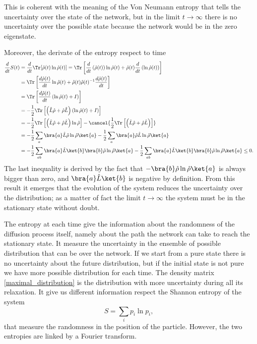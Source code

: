 This is coherent with the meaning of the Von Neumann entropy that tells the uncertainty over the state of the network, but in the limit $t \rightarrow \infty$ there is no uncertainty over the possible state because the network would be in the zero eigenstate.

Moreover, the derivate of the entropy respect to time 
\begin{equation}
    \begin{split}
        \frac{d}{dt} S(t) &= \frac{d}{dt} \Tr[\hat\rho(t) \ln\hat\rho(t)] = \Tr\left[\frac{d}{dt}\left(\hat\rho(t)\right)\ln\hat\rho(t) + \hat\rho(t) \frac{d}{dt}\left(\ln\hat\rho(t)\right)\right]\\
        &= \Tr\left[\frac{d\hat\rho(t)}{dt}\ln\hat\rho(t) + \hat\rho(t)\hat\rho(t)^{-1}\frac{d\hat\rho(t)}{dt} \right]\\
        &= \Tr\left[\frac{d\hat\rho(t)}{dt}\left(\ln\hat\rho(t) + I\right)\right]\\
        &= -\frac{1}{2}\Tr\left[\left(\hat L \hat \rho + \hat \rho \hat L\right)\left(\ln\hat\rho(t) + I\right)\right]\\
        &= -\frac{1}{2}\Tr\left[\left(\hat L \hat \rho + \hat \rho \hat L\right)\ln\hat\rho\right]-\cancel{\frac{1}{2}\Tr\left[\left(\hat L \hat \rho + \hat \rho \hat L\right)\right]}\\
        &=-\frac{1}{2}\sum_a\bra{a}\hat L\hat\rho\ln\hat\rho\ket{a}-\frac{1}{2}\sum_a\bra{a}\hat\rho\hat L\ln\hat\rho\ket{a}\\
        &=-\frac{1}{2}\sum_{ab}\bra{a}\hat L\ket{b}\bra{b}\hat\rho\ln\hat\rho\ket{a}-\frac{1}{2}\sum_{ab}\bra{a}\hat L\ket{b}\bra{b}\hat\rho\ln\hat\rho\ket{a} \leq 0.
    \end{split}
\end{equation}
The last inequality is derived by the fact that $-\bra{b}\hat\rho\ln\hat\rho\ket{a}$ is always bigger than zero, and $\bra{a}\hat L\ket{b}$  is negative by definition.
From this result it emerges that the evolution of the system reduces the uncertainty over the distribution; as a matter of fact the limit $t\rightarrow \infty$ the system must be in the stationary state without doubt.

The entropy at each time give the information about the randomness of the diffusion process itself, namely about the path the network can take to reach the stationary state. It measure the uncertainty in the ensemble of possible distribution that can be over the network. If we start from a pure state there is no uncertainty about the future distribution, but if the initial state is not pure we have more possible distribution for each time. The density matrix \eqref{maximal_distribution} is the distribution with more uncertainty during all its relaxation. 
It give us different information respect the Shannon entropy of the system
\begin{equation}
    S= \sum_i p_i\ln p_i,
\end{equation}
that measure the randomness in the position of the particle. However, the two entropies are linked by a Fourier transform.

